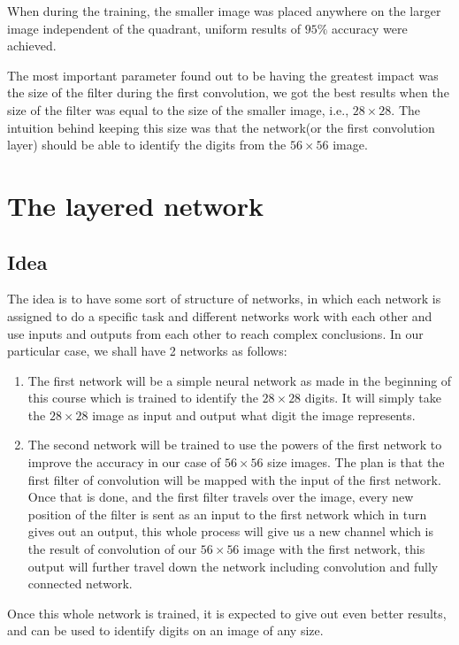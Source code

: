 \documentclass[12pt]{article}
\begin{document}
When during the training, the smaller image was placed anywhere on the larger image independent of the quadrant, uniform results of $95\%$ accuracy were achieved.

The most important parameter found out to be having the greatest impact was the size of the filter during the first convolution, we got the best results when the size of the filter was equal to the size of the smaller image, i.e., $28 \times 28$.
The intuition behind keeping this size was that the network(or the first convolution layer) should be able to identify the digits from the $56 \times 56$ image.

\section{The layered network}
\subsection{Idea}
The idea is to have some sort of structure of networks, in which each network is assigned to do a specific task and different networks work with each other and use inputs and outputs from each other to reach complex conclusions.
In our particular case, we shall have 2 networks as follows:
\begin{enumerate}
    \item The first network will be a simple neural network as made in the beginning of this course which is trained to identify the $28 \times 28$ digits. It will simply take the $28 \times 28$ image as input and output what digit the image represents.
    \item The second network will be trained to use the powers of the first network to improve the accuracy in our case of $56 \times 56$ size images. The plan is that the first filter of convolution will be mapped with the input of the first network. Once that is done, and the first filter travels over the image, every new position of the filter is sent as an input to the first network which in turn gives out an output, this whole process will give us a new channel which is the result of convolution of our $56 \times 56$ image with the first network, this output will further travel down the network including convolution and fully connected network.
\end{enumerate}
Once this whole network is trained, it is expected to give out even better results, and can be used to identify digits on an image of any size.
\end{document}
